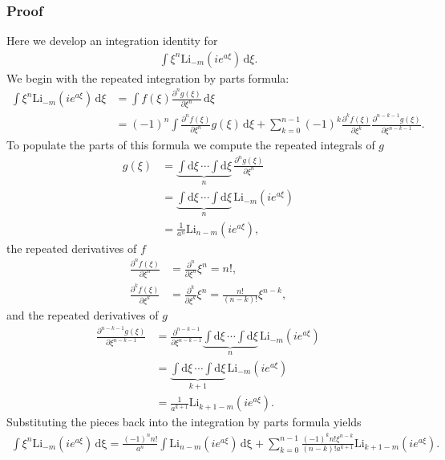 \subsubsection{Proof}
Here we develop an integration identity for
\begin{align}
\int \! \xi^{n}\mathrm{Li}_{-m}(ie^{a\xi}) \, \mathrm{d}\xi.
\end{align}
We begin with the repeated integration by parts formula:
\begin{align}
\int \! \xi^{n}\mathrm{Li}_{-m}(ie^{a\xi}) \, \mathrm{d}\xi
&= \int \! f(\xi) \frac{\partial^n g(\xi)}{\partial \xi^n} \, \mathrm{d}\xi \\
&= (-1)^n \int \! \frac{\partial^n f(\xi)}{\partial \xi^n} g(\xi) \, \mathrm{d}\xi
+ \sum_{k=0}^{n-1} \!
(-1)^k \frac{\partial^k f(\xi)}{\partial \xi^k}
\frac{\partial^{n-k-1} g(\xi)}{\partial \xi^{n-k-1}}.
\end{align}
To populate the parts of this formula we compute the repeated integrals of $g$
\begin{align}
g(\xi)
&= \underbrace{\int \! \mathrm{d}\xi \, \cdots \int \! \mathrm{d}\xi}_{n} \,
    \frac{\partial^n g(\xi)}{\partial \xi^n} \\
&= \underbrace{\int \! \mathrm{d}\xi \, \cdots \int \! \mathrm{d}\xi}_{n} \, \mathrm{Li}_{-m}(ie^{a\xi}) \\
&= \frac{1}{a^{n}}\mathrm{Li}_{n - m}(ie^{a\xi}),
\end{align}
the repeated derivatives of $f$
\begin{align}
\frac{\partial^n f(\xi)}{\partial \xi^n} &=
    \frac{\partial^n}{\partial \xi^n} \xi^n = n!, \\
\frac{\partial^k f(\xi)}{\partial \xi^k} &=
    \frac{\partial^k}{\partial \xi^k} \xi^n =
    \frac{n!}{(n-k)!} \xi^{n-k},
\end{align}
and the repeated derivatives of $g$
\begin{align}
\frac{\partial^{n-k-1} g(\xi)}{\partial \xi^{n-k-1}}
    &= \frac{\partial^{n-k-1}}{\partial \xi^{n-k-1}}
    \underbrace{\int \! \mathrm{d}\xi \, \cdots \int \! \mathrm{d}\xi}_{n} \, \mathrm{Li}_{-m}(ie^{a\xi}) \\
    &= \underbrace{\int \! \mathrm{d}\xi \, \cdots \int \! \mathrm{d}\xi}_{k+1} \, \mathrm{Li}_{-m}(ie^{a\xi}) \\
    &= \frac{1}{a^{k+1}} \mathrm{Li}_{k+1-m}(ie^{a\xi}).
\end{align}
Substituting the pieces back into the integration by parts formula yields
\begin{align}
\int \! \xi^{n}\mathrm{Li}_{-m}(ie^{a\xi}) \, \mathrm{d\xi}
=  \frac{(-1)^n n!}{a^{n}} \int \!
\mathrm{Li}_{n - m}(ie^{a\xi}) \,
\mathrm{d\xi}
+ \sum_{k=0}^{n-1} \!
\frac{(-1)^k n! \xi^{n-k}}{(n-k)! a^{k+1}} \mathrm{Li}_{k+1-m}(ie^{a\xi}).
\end{align}
